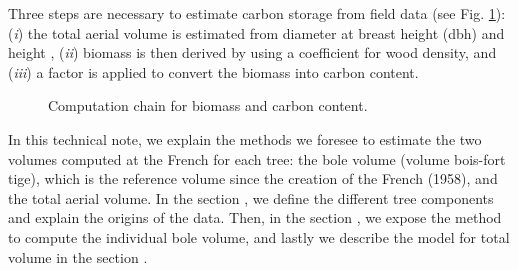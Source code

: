 Three steps are necessary to estimate carbon storage from field data (see Fig. \ref{fig::scheme}): (\textit{i}) the total aerial volume is estimated from diameter at breast height (dbh) and height \parencite{Vallet2006}, (\textit{ii}) biomass is then derived by using a coefficient for wood density, and (\textit{iii}) a factor is applied to convert the biomass into carbon content. \\

\begin{figure}[h]
    \centering
	
	\caption{Computation chain for biomass and carbon content.\label{fig::scheme}}
\end{figure}

In this technical note, we explain the methods we foresee to estimate the two volumes computed at the French \NFI{} for each tree: the bole volume (volume bois-fort tige), which is the reference volume since the creation of the French \NFI{} (1958), and the total aerial volume. In the section , we define the different tree components and explain the origins of the data. Then, in the section , we expose the method to compute the individual bole volume, and lastly we describe the model for total volume in the section .
